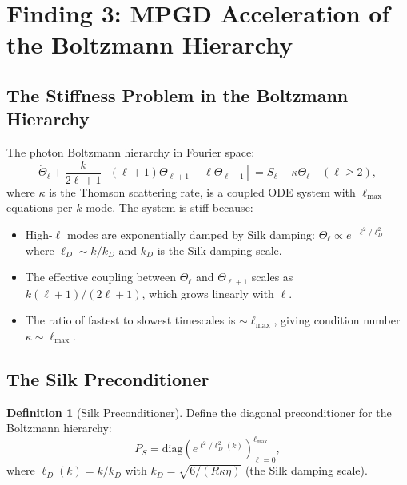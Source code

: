 \documentclass[11pt]{article}
\theoremstyle{definition}
\newtheorem{definition}[theorem]{Definition}
\theoremstyle{remark}
\begin{document}
\section{Finding 3: MPGD Acceleration of the Boltzmann Hierarchy}
\label{sec:silk-preconditioner}

\subsection{The Stiffness Problem in the Boltzmann Hierarchy}
\label{sec:boltzmann-stiffness}

The photon Boltzmann hierarchy in Fourier space:
\begin{equation}
  \dot\Theta_\ell + \frac{k}{2\ell+1}\left[(\ell+1)\Theta_{\ell+1}
  - \ell\Theta_{\ell-1}\right] = S_\ell - \dot\kappa \Theta_\ell
  \quad (\ell \geq 2),
  \label{eq:boltzmann-hierarchy}
\end{equation}
where $\dot\kappa$ is the Thomson scattering rate, is a coupled ODE
system with $\ell_{\max}$ equations per $k$-mode. The system is stiff
because:
\begin{itemize}[nosep]
\item High-$\ell$ modes are exponentially damped by Silk damping:
  $\Theta_\ell \propto e^{-\ell^2/\ell_D^2}$ where $\ell_D \sim k/k_D$
  and $k_D$ is the Silk damping scale.
\item The effective coupling between $\Theta_\ell$ and $\Theta_{\ell+1}$
  scales as $k(\ell+1)/(2\ell+1)$, which grows linearly with $\ell$.
\item The ratio of fastest to slowest timescales is $\sim \ell_{\max}$,
  giving condition number $\kappa \sim \ell_{\max}$.
\end{itemize}

\subsection{The Silk Preconditioner}
\label{sec:silk-preconditioner-def}

\begin{definition}[Silk Preconditioner]
\label{def:silk-preconditioner}
Define the diagonal preconditioner for the Boltzmann hierarchy:
\begin{equation}
  P_S = \text{diag}\!\left(e^{\ell^2/\ell_D^2(k)}\right)_{\ell=0}^{\ell_{\max}},
  \label{eq:silk-preconditioner}
\end{equation}
where $\ell_D(k) = k/k_D$ with $k_D = \sqrt{6/(R \dot\kappa \eta)}$
(the Silk damping scale).
\end{definition}
\end{document}
